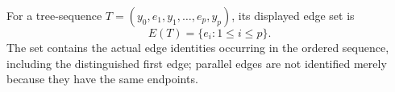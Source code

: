 \begin{definition}
For a tree-sequence
$T=(y_0,e_1,y_1,\ldots,e_p,y_p)$, its displayed edge set is
\[
 E(T)=\{e_i:1\leq i\leq p\}.
\]
The set contains the actual edge identities occurring in the ordered
sequence, including the distinguished first edge; parallel edges are not
identified merely because they have the same endpoints.
\end{definition}
